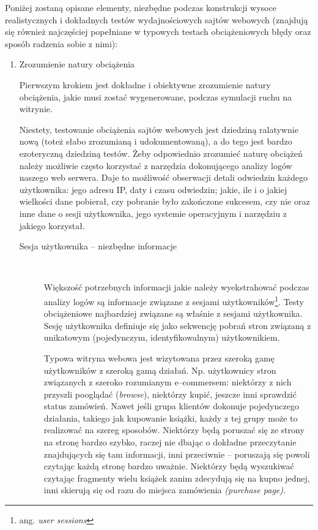 Poniżej zostaną opisane elementy, niezbędne podczas konstrukcji
wysoce realistycznych i dokładnych testów wydajnościowych sajtów webowych (znajdują się również najczęściej popełniane w
typowych testach obciążeniowych błędy oraz sposób radzenia sobie z nimi):
\begin{enumerate}
\item Zrozumienie natury obciążenia

Pierwszym krokiem jest dokładne i obiektywne zrozumienie
natury obciążenia, jakie musi zostać wygenerowane, podczas symulacji ruchu na witrynie.

Niestety, testowanie obciążenia sajtów webowych jest dziedziną ralatywnie
nową (toteż słabo zrozumianą i udokumentowaną), a do tego jest bardzo ezoteryczną
dziedziną testów. Żeby odpowiednio zrozumieć naturę obciążeń należy możliwie
często korzystać z narzędzia dokonującego analizy logów naszego web serwera.
Daje to możliwość obserwacji detali odwiedzin każdego użytkownika: jego adresu IP, daty i czasu odwiedzin; jakie, 
ile i o jakiej wielkości dane pobierał, czy pobranie było zakończone sukcesem, czy nie oraz inne dane o sesji użytkownika, 
jego systemie operacyjnym i narzędziu z jakiego korzystał. 

    \begin{description}
    \item[Sesja użytkownika -- niezbędne informacje]\

Większość potrzebnych informacji jakie należy wyekstrahować podczas analizy logów są informacje związane z sesjami 
użytkowników\footnote{ang. \emph{user sessions}}. Testy obciążeniowe najbardziej związane są właśnie z sesjami użytkownika. 
Sesję użytkownika definiuje się jako sekwencję pobrań stron związaną z unikatowym (pojedynczym, identyfikowalnym) użytkownikiem.

Typowa witryna webowa jest wizytowana przez szeroką gamę użytkowników z szeroką gamą działań. Np. użytkownicy stron związanych 
z szeroko rozumianym e--commersem: niektórzy z nich przyszli pooglądać (\emph{browse}), niektórzy kupić, jeszcze inni 
sprawdzić status
zamówień. Nawet jeśli grupa klientów dokonuje pojedynczego działania, takiego jak kupowanie książki, każdy z tej grupy może to 
realizować na szereg sposobów. Niektórzy będą poruszać się ze strony na stronę bardzo szybko, raczej nie dbając o dokładne 
przeczytanie znajdujących się tam informacji, inni przeciwnie -- poruszają się powoli czytając każdą stronę bardzo uważnie. 
Niektórzy będą wyszukiwać czytając fragmenty wielu książek zanim zdecydują się na kupno jednej, inni skierują się od razu do 
miejsca zamówienia \emph{(purchase page)}.


\end{description}
\end{enumerate}
